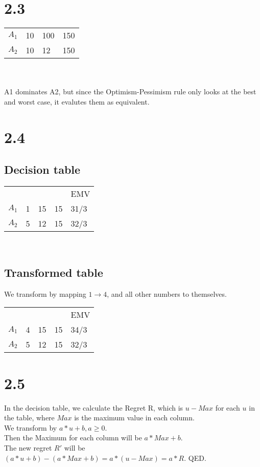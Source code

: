 \documentclass{article}
\begin{document}
\section*{2.3}

\begin{tabular}{l|l|l|l|}
\cline{2-4}
  $A_{1}$ & 10 & 100 & 150 \\ \cline{2-4}
  $A_{2}$ & 10 & 12 & 150 \\ \cline{2-4} 
\end{tabular}\\ 
\\A1 dominates A2, but since the Optimism-Pessimism rule only looks at the best and worst case, it evalutes them as equivalent.

\section*{2.4}
\subsection*{Decision table}
\begin{tabular}{l|l|l|l||l|}
\cline{2-5}
  & & & & EMV \\ \cline{2-5}
  $A_{1}$ & 1 & 15 & 15 & 31/3 \\ \cline{2-5}
  $A_{2}$ & 5 & 12 & 15 & 32/3 \\ \cline{2-5}
\end{tabular} \\

\subsection*{Transformed table}
We transform by mapping $1 \to 4$, and all other numbers to themselves. \\
\begin{tabular}{l|l|l|l||l|}
\cline{2-5}
  & & & & EMV \\ \cline{2-5}
  $A_{1}$ & 4 & 15 & 15 & 34/3 \\ \cline{2-5}
  $A_{2}$ & 5 & 12 & 15 & 32/3 \\ \cline{2-5}
\end{tabular}

\section*{2.5}
In the decision table, we calculate the Regret R, which is $u - Max$ for each $u$ in the table, where $Max$ is the maximum value in each column. \\ 
We transform by $a*u + b, a \geq 0$. \\
Then the Maximum for each column will be $a*Max + b$. \\
The new regret $R'$ will be $(a*u + b) - (a*Max + b) = a*(u-Max) = a*R$. QED.
\end{document}
